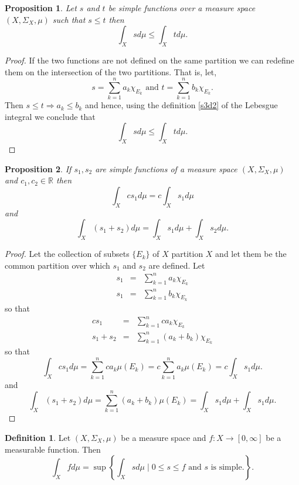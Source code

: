 \documentclass{article}
\newcommand{\sor}{\mathbb{R}}
\theoremstyle{plain}
\numberwithin{thm}{section}
\theoremstyle{plain}
\newtheorem{prop}{Proposition}
\numberwithin{prop}{section}
\theoremstyle{definition}
\newtheorem{defn}{Definition}
\numberwithin{defn}{section}
\theoremstyle{remark}
\theoremstyle{plain}
\numberwithin{cor}{section}
\numberwithin{equation}{section}
\begin{document}
\begin{prop}\label{s3p4}
Let $s$ and $ t$ be simple functions over a measure space $(X, \Sigma_X, \mu)$
such that $s \le  t$ then
\[
\int_Xs d\mu \le \int_X t d\mu.
\]
\end{prop}
\begin{proof}
If the two functions are not defined on the same partition we can redefine them
on the intersection of the two partitions. That is, let,
\[
s = \sum_{k=1}^n a_k\chi_{E_k} \text{ and }  t = \sum_{k=1}^n b_k\chi_{E_k}.
\]
Then $s \le  t \Rightarrow a_k \le b_k$ and hence, using the definition
\ref{s3d2} of the Lebesgue integral we conclude that
\[
\int_Xs d\mu \le \int_X t d\mu.
\]
\end{proof}

\begin{prop}\label{s3p5}
If $s_1, s_2$ are simple functions of a measure space $(X, \Sigma_X, \mu)$
and $c_1, c_2 \in \sor$ then
\[
\int_X cs_1 d\mu = c\int_Xs_1 d\mu
\]
and
\[
\int_X(s_1 + s_2)d\mu = \int_Xs_1 d\mu + \int_Xs_2 d\mu.
\]
\end{prop}
\begin{proof}
Let the collection of subsets $\{E_k\}$ of $X$ partition $X$ and let them be the
common partition over which $s_1$ and $s_2$ are defined. Let
\begin{eqnarray*}
s_1 &=& \sum_{k=1}^na_k\chi_{E_k} \\
s_1 &=& \sum_{k=1}^nb_k\chi_{E_k} 
\end{eqnarray*}
so that
\begin{eqnarray*}
cs_1 &=& \sum_{k=1}^n ca_k\chi_{E_k} \\
s_1 + s_2 &=& \sum_{k=1}^n(a_k + b_k)\chi_{E_k}
\end{eqnarray*}
so that
\[
\int_X cs_1 d\mu = \sum_{k=1}^n ca_k\mu(E_k) = c\sum_{k=1}^na_k\mu(E_k)
= c\int_Xs_1 d\mu.
\]
and
\[
\int_X(s_1 + s_2)d\mu = \sum_{k=1}^n(a_k + b_k)\mu(E_k) = 
\int_Xs_1 d\mu + \int_Xs_1 d\mu.
\]
\end{proof}

\begin{defn}
Let $(X, \Sigma_X, \mu)$ be a measure space and $f:X \rightarrow [0, \infty]$ be
a measurable function. Then
\[
\int_X f d\mu = 
\sup\left\{\int_X sd\mu \;|\; 0 \le s \le f \text{ and } s \text{ is simple.}\right\}.
\]
\end{defn}
\end{document}
